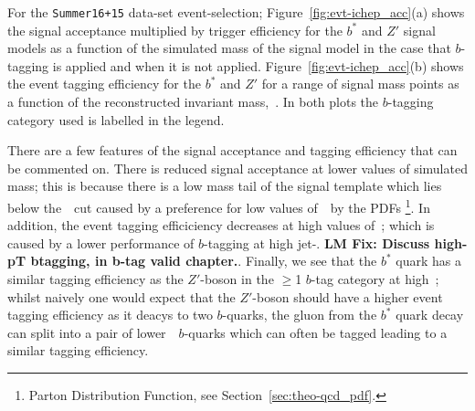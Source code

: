 For the \verb|Summer16+15| data-set event-selection;
Figure~\ref{fig:evt-ichep_acc}(a) shows the signal acceptance multiplied by trigger efficiency
for the $b^*$ and $Z'$ signal models
as a function of the simulated mass of the signal model
in the case that $b$-tagging is applied and when it is not applied.
Figure~\ref{fig:evt-ichep_acc}(b) shows the event tagging efficiency
for the $b^*$ and $Z'$ for a range of signal mass points
as a function of the reconstructed invariant mass,~\mjj.
In both plots the $b$-tagging category used is labelled in the legend.

There are a few features of the signal acceptance and tagging efficiency that can be commented on.
There is reduced signal acceptance at lower values of simulated mass;
this is because there is a low mass tail of the signal template which lies below the~\mjj~cut
caused by a preference for low values of~\mjj~by the PDFs
\footnote{Parton Distribution Function, see Section~\ref{sec:theo-qcd_pdf}.}.
In addition, the event tagging efficiciency decreases at high values of~\mjj;
which is caused by a lower performance of $b$-tagging at high jet-\pT.
\textbf{LM Fix: Discuss high-pT btagging, in b-tag valid chapter.}.
Finally, we see that the $b^*$ quark has a similar tagging efficiency
as the $Z'$-boson in the $\geq$1 $b$-tag category at high~\mjj;
whilst naively one would expect that the $Z'$-boson should have a higher
event tagging efficiency as it deacys to two $b$-quarks,
the gluon from the $b^*$ quark decay can split into a pair of lower~\pT~$b$-quarks
which can often be tagged leading to a similar tagging efficiency.


